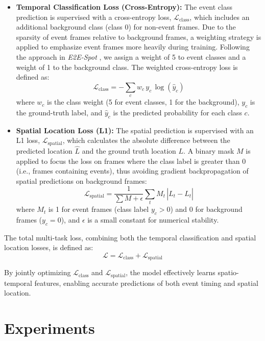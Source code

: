 \documentclass[conference]{IEEEtran}
\begin{document}
\begin{itemize}
    \item \textbf{Temporal Classification Loss (Cross-Entropy):} The event class prediction is supervised with a cross-entropy loss, \(\mathcal{L}_{\text{class}}\), which includes an additional background class (class 0) for non-event frames. Due to the sparsity of event frames relative to background frames, a weighting strategy is applied to emphasize event frames more heavily during training. Following the approach in \textit{E2E-Spot} \cite{spot22}, we assign a weight of 5 to event classes and a weight of 1 to the background class. The weighted cross-entropy loss is defined as:
    \[
    \mathcal{L}_{\text{class}} = -\sum_{c} w_c \, y_{c} \, \log(\hat{y}_{c})
    \]
    where \(w_c\) is the class weight (5 for event classes, 1 for the background), \(y_c\) is the ground-truth label, and \(\hat{y}_{c}\) is the predicted probability for each class \(c\).

    \item \textbf{Spatial Location Loss (L1):} The spatial prediction is supervised with an L1 loss, \(\mathcal{L}_{\text{spatial}}\), which calculates the absolute difference between the predicted location \(\hat{L}\) and the ground truth location \(L\). A binary mask \(M\) is applied to focus the loss on frames where the class label is greater than 0 (i.e., frames containing events), thus avoiding gradient backpropagation of spatial predictions on background frames:
    \[
    \mathcal{L}_{\text{spatial}} = \frac{1}{\sum M + \epsilon} \sum_{t} M_t \, |\hat{L}_t - L_t|
    \]
    where \(M_t\) is 1 for event frames (class label $y_c > 0$) and 0 for background frames ($y_c = 0$), and \(\epsilon\) is a small constant for numerical stability.

\end{itemize}

The total multi-task loss, combining both the temporal classification and spatial location losses, is defined as:
\[
\mathcal{L} = \mathcal{L}_{\text{class}} + \mathcal{L}_{\text{spatial}}
\]

By jointly optimizing \(\mathcal{L}_{\text{class}}\) and \(\mathcal{L}_{\text{spatial}}\), the model effectively learns spatio-temporal features, enabling accurate predictions of both event timing and spatial location.



\section{Experiments}
\end{document}
